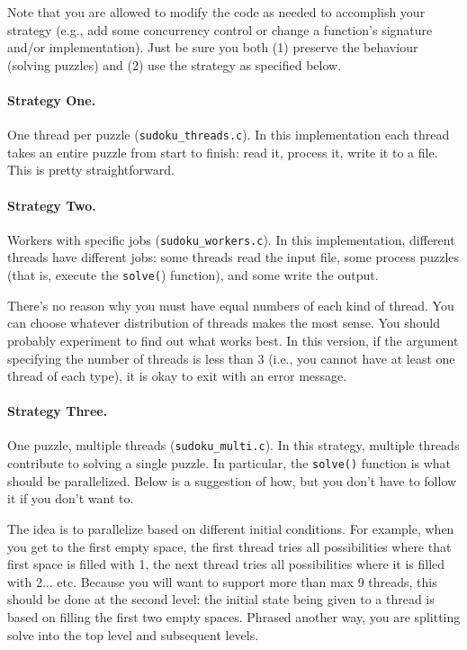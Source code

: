 \documentclass[letterpaper,10pt]{article}
\begin{document}
Note that you are allowed to 
modify the code as needed to accomplish your strategy (e.g., add some
concurrency control or change a function's signature and/or implementation).
Just be sure you both (1) preserve the behaviour (solving puzzles) and
(2) use the strategy as specified below.

\paragraph{Strategy One.}
One thread per puzzle (\texttt{sudoku\_threads.c}). In this implementation 
each thread takes an entire puzzle from start to finish: read it, process it, 
write it to a file. This is pretty straightforward.

\paragraph{Strategy Two.} Workers with specific jobs (\texttt{sudoku\_workers.c}). In this implementation, different threads 
have different jobs: some threads read the input file, some process puzzles
(that is, execute the \texttt{solve(}) function), 
and some write the output.
	
There's no reason why you must have equal numbers of each kind of thread.
You can choose whatever distribution of threads makes the most sense. You
should probably experiment to find out what works best. In this version,
if the argument specifying the number of threads is less than 3 (i.e., you
cannot have at least one thread of each type), it is okay to exit with an
error message.

\paragraph{Strategy Three.}

One puzzle, multiple threads (\texttt{sudoku\_multi.c}). In this strategy, 
multiple threads contribute to solving a single puzzle. In particular, 
the \texttt{solve()} function is what should be parallelized.
Below is a suggestion of how, but you don't have to follow it if you
don't want to.  


The idea is to parallelize based on different initial conditions. 
For example, when you get to the first
empty space, the first thread tries all possibilities where that first
space is filled with 1, the next thread tries all possibilities where 
it is filled with 2... etc.
Because you will want to support more than max 9 threads, this should be
done at the second level: the initial state being given to a
thread is based on filling the first two empty spaces. Phrased another way,
you are splitting solve into the top level and subsequent levels.
\end{document}
